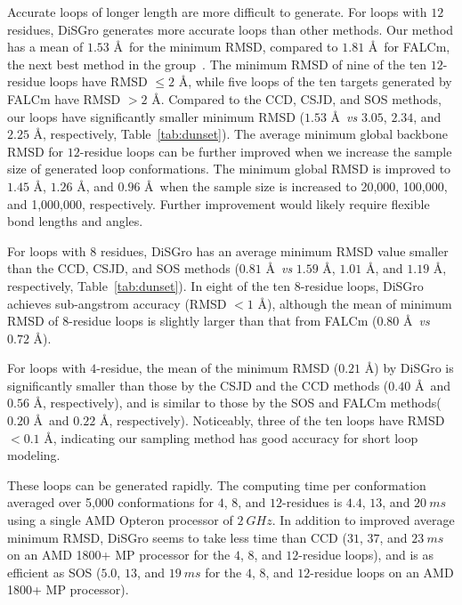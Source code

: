 Accurate loops of longer length are more difficult to generate. For
loops with $12$ residues, {\sc DiSGro} generates more accurate loops
than other methods. Our method has a mean of $1.53$ \r{A}\ for the
minimum RMSD, compared to $1.81$ \r{A}\ for FALCm, the next best
method in the group~\cite{lee2010}. The minimum RMSD of nine of the
ten $12$-residue loops have RMSD $\le2$ \r{A}, while five loops of
the ten targets generated by FALCm have RMSD $>2$ \r{A}. Compared to
the CCD, CSJD, and SOS methods, our loops have significantly smaller
minimum RMSD ($1.53$ \r{A}\ {\it vs}\/ $3.05$, $2.34$, and $2.25$
\r{A}, respectively, Table~\ref{tab:dunset}). The average minimum
global backbone RMSD for $12$-residue loops can be further improved
when we increase the sample size of generated loop conformations.
The minimum global RMSD is improved to $1.45$ \r{A}, $1.26$ \r{A},
and $0.96$ \r{A}\ when the sample size is increased to 20,000,
100,000, and 1,000,000, respectively. Further improvement would
likely require flexible bond lengths and angles.

For loops with $8$ residues, {\sc DiSGro} has an average minimum
RMSD value smaller than the CCD, CSJD, and SOS methods ($0.81$
\r{A}\ {\it vs}\/ $1.59$ \r{A}, $1.01$ \r{A}, and $1.19$ \r{A},
respectively, Table~\ref{tab:dunset}). In eight of the ten
$8$-residue loops, {\sc DiSGro} achieves sub-angstrom accuracy (RMSD
$<1$ \r{A}), although the mean of minimum RMSD of $8$-residue loops
is slightly larger than that from FALCm ($0.80$ \r{A}\ {\it vs}\/
$0.72$ \r{A}).

For loops with $4$-residue, the mean of the minimum RMSD ($0.21$
\r{A})
 by {\sc DiSGro} is significantly smaller
than those by the CSJD and the CCD methods ($0.40$ \r{A}\ and $0.56$
\r{A}, respectively), and is similar to those by the SOS and FALCm
methods($0.20$ \r{A}\ and $0.22$ \r{A}, respectively). Noticeably,
three of the ten loops have RMSD $<0.1$ \r{A}, indicating our
sampling method has good accuracy for short loop modeling.

These loops can be generated rapidly. The computing time per
conformation averaged over 5,000 conformations for $4$, $8$, and
$12$-residues is $4.4$, $13$, and $20\:ms$ using a single AMD
Opteron processor of $2\:GHz$. In addition to improved average
minimum RMSD, {\sc DiSGro} seems to take less time than CCD ($31$,
$37$, and $23\:ms$ on an AMD 1800+ MP processor for the $4$, $8$,
and $12$-residue loops), and is as efficient as SOS ($5.0$, $13$,
and $19\:ms$ for the $4$, $8$, and $12$-residue loops on an AMD
1800+ MP processor).

